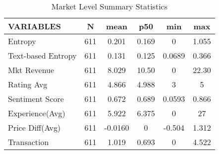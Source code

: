 \begin{table}
\centering
\begin{tabular}{@{}lccccc@{}}
\toprule
VARIABLES          & N   & mean    & p50   & min    & max   \\ \midrule
Entropy            & 611 & 0.201   & 0.169 & 0      & 1.055 \\
Text-based Entropy & 611 & 0.131   & 0.125 & 0.0689 & 0.366 \\
Mkt Revenue        & 611 & 8.029   & 10.50 & 0      & 22.30 \\
Rating Avg         & 611 & 4.866   & 4.988 & 3      & 5     \\
Sentiment Score    & 611 & 0.672   & 0.689 & 0.0593 & 0.866 \\
Experience(Avg)    & 611 & 5.922   & 6.375 & 0      & 27    \\
Price Diff(Avg)    & 611 & -0.0160 & 0     & -0.504 & 1.312 \\
Transaction        & 611 & 1.019   & 0.693 & 0      & 4.522 \\ \bottomrule
\end{tabular}
\caption{Market Level Summary Statistics }
\label{sumstats_mkt}
\end{table}